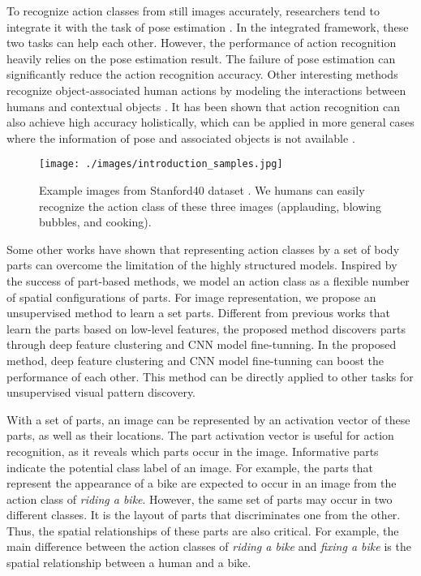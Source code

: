 \documentclass[journal]{IEEEtran}
\begin{document}
To recognize action classes from still images accurately, researchers tend to integrate it with the task of pose estimation \cite{YangWMCVPR10,Yao_modeling_mutual_2010_CVPR}.
In the integrated framework, these two tasks can help each other.
However, the performance of action recognition heavily relies on the pose estimation result. The failure of pose estimation can significantly reduce the action recognition accuracy. Other interesting methods recognize object-associated human actions by modeling the interactions between humans and contextual objects \cite{Delaitre11learningperson-object,GroupletYaoBangpengFeifeiLI}.
It has been shown that action recognition can also achieve high accuracy holistically, which can be applied in more general cases where the information of pose and associated objects is not available \cite{sharma:CVPR2012_Discriminative,Delaitre10recognizinghuman,sharma:CVPR2013}.

\begin{figure}[h]
	\begin{center}
		\texttt{[image: ./images/introduction\_samples.jpg]}
	\end{center}
	\caption{Example images from Stanford40 dataset \cite{Yao11humanaction__Stanford40}. We humans can easily recognize the action class of these three images (applauding, blowing bubbles, and cooking).}
	\label{fig:introductionExample}
\end{figure}

Some other works \cite{Yao11humanaction__Stanford40,MajiActionCVPR11,sharma:CVPR2013,BourdevMalikICCV09,Yao_modeling_mutual_2010_CVPR} have shown that representing action classes by a set of body parts can overcome the limitation of the highly structured models.
Inspired by the success of part-based methods, we model an action class as a flexible number of spatial configurations of parts.
For image representation, we propose an unsupervised method to learn a set parts. Different from previous works that learn the parts based on low-level features, the proposed method discovers parts through deep feature clustering and CNN model fine-tunning.
In the proposed method, deep feature clustering and CNN model fine-tunning can boost the performance of each other. This method can be directly applied to other tasks for unsupervised visual pattern discovery.


With a set of parts, an image can be represented by an activation vector of these parts, as well as their locations. The part activation vector is useful for action recognition, as it reveals which parts occur in the image. Informative parts indicate the potential class label of an image. For example, the parts that represent the appearance of a bike are expected to occur in an image from the action class of \textit{riding a bike}.
However, the same set of parts may occur in two different classes. It is the layout of parts that discriminates one from the other.
Thus, the spatial relationships of these parts are also critical.
For example, the main difference between the action classes of \textit{riding a bike} and \textit{fixing a bike} is the spatial relationship between a human and a bike.
\end{document}
